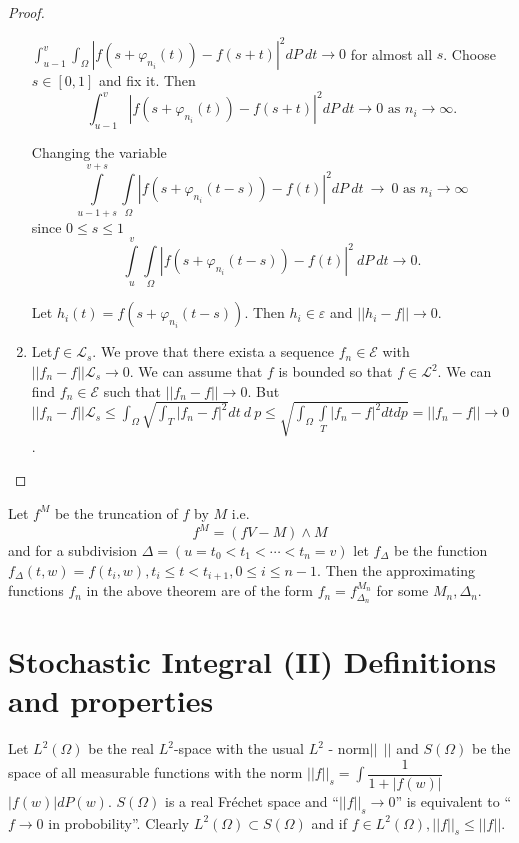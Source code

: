 \begin{proof}
\begin{enumerate}
$\int^v_{u-1} \int_{\Omega} |f(s+ \varphi_{n_{i}} (t)) - f(s+t) |^2  dP\
 dt \to 0$ for almost all $s$. Choose $s \in [0, 1]$ and fix
it. Then  
$$ 
\int^v_{u-1}  |f(s+ \varphi_{n_{i}} (t)) - f(s+t) |^2  dP ~ dt
\to 0 \text{ as } n_i \to \infty. 
$$

Changing the variable
$$
\int\limits^{v+s}_{u-1+s} \int \limits_{\Omega} |f(s+ \varphi_{n_{i}} (t-s)) - f(t)
|^2  dP\ dt ~  \to ~ 0 \text{ as } n_i \to \infty 
$$
since $0 \leq s \leq 1$
$$
\int\limits^v_{u} \int\limits_{\Omega} |f(s+ \varphi_{n_i} (t-s)) 
- f(t) |^2\ dP\ dt \to 0.  
$$

Let $h_i(t) = f(s+ \varphi_{n_i}(t-s))$. Then $h_i \in \varepsilon$
and $|| h_i -f|| \to 0.$ 

\item Let\pageoriginale $ f \in \mathscr{L}_s$. We prove that there exista
  a sequence $f_n \in \mathscr{E} $ with $|| f_n - f || \mathscr{L}_s
  \to 0$. We can assume that $f$ is bounded so that $ f \in
  \mathscr{L}^2$. We can find $f_n \in \mathscr{E}$ such that $||f_n -
  f || \to 0$. But $|| f_n - f|| \mathscr{L}_s \leq \int_\Omega \sqrt{
    \int _T | f_n - f |^2 } dt ~ d ~ p \leq \sqrt{\int_\Omega
    \int\limits_T | f_n - f|^2 dt d p} = || f_n - f|| \to 0$.  
\end{enumerate}
\end{proof}

\begin{remark*}
 Let $f^M$ be the truncation of $f$ by $M$ i.e. 
  $$
  f^M = (f V - M ) \wedge M 
  $$
  and for a subdivision $\Delta = (u = t_0 < t_1 < \cdots< t_n = v
  )$ let $f_\Delta$ be the function$f_\Delta (t, w) = f (t_i ,
  w), t_i \leq t < t_{ i +1}, 0 \leq i \leq n - 1$. Then the
  approximating functions $f_n$ in the above theorem are of the form
  $f_n = f_{\Delta_n}^{M_n}$ for some $M_n, \Delta _n$.  
\end{remark*}

\section{Stochastic Integral (II) Definitions and
  properties}\label{chap5-sec3} %

Let $L^2 (\Omega)$ be the real $L^2$-space with the usual $L^2$ -
norm$|| ~~||$ and $S(\Omega)$ be the space of all measurable functions
with the norm $|| f ||_s = \int \dfrac{1}{ 1 + | f (w)|}$ $|f (w)| d P
(w)$. $S(\Omega)$ is a real Fr\'echet space and ``$|| f || _s \to 0$''
is equivalent to ``$f \to 0$ in probobility''. Clearly $L^2 (\Omega)
\subset S (\Omega)$ and if $f \in L^2 (\Omega), || f ||_s \leq || f ||$.   

